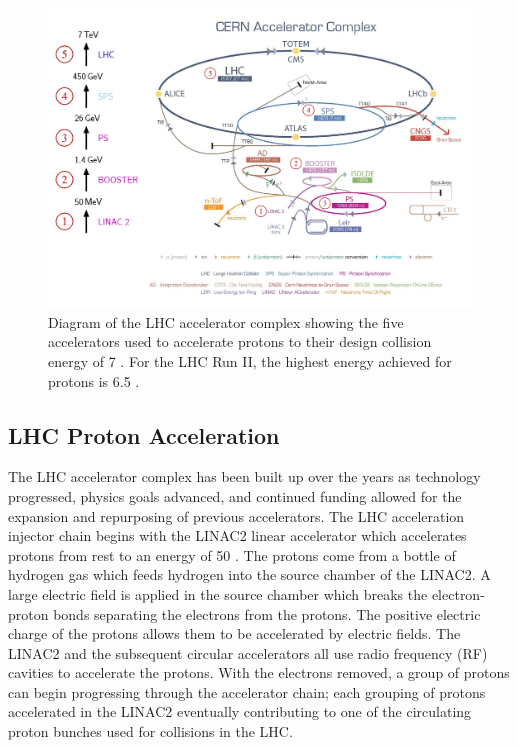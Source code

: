 \begin{figure}[htbp]
\centering
     \includegraphics[width=1.0\textwidth]{cms_and_lhc/plots/lhc_complex.png}
     \caption{
Diagram of the LHC accelerator complex showing the five accelerators used to accelerate
protons to their design collision energy of 7 \TeV. For the LHC Run II, the highest energy 
achieved for protons is 6.5 \TeV.
     }
     \label{fig:lhc_complex}
\end{figure}



\subsection{LHC Proton Acceleration}
The LHC accelerator complex has been built up over the years as technology progressed,
physics goals advanced, and continued funding allowed for the expansion and repurposing
of previous accelerators. The LHC acceleration injector chain begins with the LINAC2 linear
accelerator which accelerates protons from rest to an energy of 50 \MeV. 
The protons come from a bottle of hydrogen gas which feeds hydrogen
into the source chamber of the LINAC2. A large electric field is applied in the source
chamber which breaks the electron-proton bonds separating the electrons from the protons.
The positive electric charge of the protons allows them to be accelerated by electric
fields. The LINAC2 and the subsequent circular accelerators all use radio frequency (RF)
cavities to accelerate the protons.
With the electrons removed, a group of protons can begin progressing through the accelerator
chain; each grouping of protons accelerated in the LINAC2 eventually contributing to one of the 
circulating proton bunches used for collisions in the LHC.

